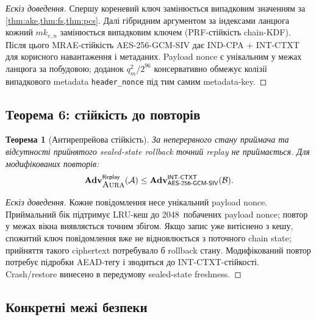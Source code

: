 \documentclass[11pt,a4paper]{article}
\newtheorem{theorem}{Теорема}[section]
\theoremstyle{definition}
\newcommand{\adv}{\ensuremath{\mathbf{Adv}}}
\newcommand{\advA}{\ensuremath{\mathcal{A}}}
\newcommand{\advB}{\ensuremath{\mathcal{B}}}
\newcommand{\AEAD}{\textsf{AES-256-GCM-SIV}}
\newcommand{\INDCPA}{\textsf{IND-CPA}}
\newcommand{\INTCTXT}{\textsf{INT-CTXT}}
\newcommand{\MRAE}{\textsf{MRAE}}
\newcommand{\PRF}{\textsf{PRF}}
\newcommand{\mk}{\ensuremath{\mathit{mk}}}
\newcommand{\Aura}{\mbox{\normalfont\scshape Aura}}
\begin{document}
\begin{proof}[Ескіз доведення]
Спершу кореневий ключ замінюється випадковим значенням за
\cref{thm:ake,thm:fs,thm:pcs}. Далі гібридним аргументом за індексами
ланцюга кожний $\mk_{e,n}$ замінюється випадковим ключем
(\PRF{}-стійкість chain-KDF). Після цього \MRAE{}-стійкість
\AEAD{} дає \INDCPA{} + \INTCTXT{} для корисного навантаження і
метаданих. Payload nonce є унікальним у межах ланцюга за побудовою; доданок
$q_m^2/2^{96}$ консервативно обмежує колізії випадкового metadata
\texttt{header\_nonce} під тим самим metadata-key.
\end{proof}

\subsection{Теорема 6: стійкість до повторів}\label{sec:thm6}

\begin{theorem}[Антирепрейова стійкість]\label{thm:replay}
За неперервного стану приймача та відсутності прийнятого sealed-state
rollback точний replay не приймається. Для модифікованих повторів:
\begin{equation}\label{eq:replay-bound}
  \adv^{\mathsf{Replay}}_{\Aura}(\advA)
  \le
  \adv^{\INTCTXT}_{\AEAD}(\advB).
\end{equation}
\end{theorem}

\begin{proof}[Ескіз доведення]
Кожне повідомлення несе унікальний payload nonce.
Приймальний бік підтримує LRU-кеш до 2048~побачених payload nonce;
повтор у межах вікна виявляється точним збігом.
Якщо запис уже витіснено з кешу, спожитий ключ повідомлення вже не
відновлюється з поточного chain state; прийняття такого ciphertext потребувало
б rollback стану. Модифікований повтор потребує підробки AEAD-тегу і
зводиться до \INTCTXT{}-стійкості. Crash/restore винесено в передумову
sealed-state freshness.
\end{proof}

\subsection{Конкретні межі безпеки}\label{sec:bounds}
\end{document}
